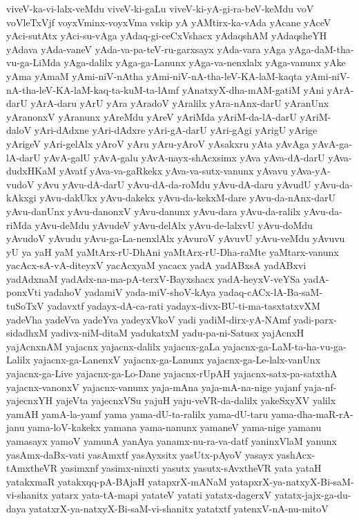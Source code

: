 {viveV-ka-vi-lalx-veMdu
viveV-ki-gaLu
viveV-ki-yA-gi-ra-beV-keMdu
voV
voVleTxVjf
voyxVminx-voyxVma
vskip
yA
yAMtirx-ka-vAda
yAcane
yAceV
yAci-sutAtx
yAci-su-vAga
yAdaq-gi-ceCxVshacx
yAdaqshAM
yAdaqsheYH
yAdava
yAda-vaneV
yAda-va-pa-teV-ru-garxsayx
yAda-vara
yAga
yAga-daM-tha-vu-ga-LiMda
yAga-dalilx
yAga-ga-Lanunx
yAga-va-nenxlalx
yAga-vanunx
yAke
yAma
yAmaM
yAmi-niV-nAtha
yAmi-niV-nA-tha-leV-KA-laM-kaqta
yAmi-niV-nA-tha-leV-KA-laM-kaq-ta-kuM-ta-lAmf
yAnatxyX-dha-mAM-gatiM
yAni
yArA-darU
yArA-daru
yArU
yAra
yAradoV
yAralilx
yAra-nAnx-darU
yAranUnx
yAranonxV
yAranunx
yAreMdu
yAreV
yAriMda
yAriM-da-lA-darU
yAriM-daloV
yAri-dAdxne
yAri-dAdxre
yAri-gA-darU
yAri-gAgi
yArigU
yArige
yArigeV
yAri-gelAlx
yAroV
yAru
yAru-yAroV
yAsakxru
yAta
yAvAga
yAvA-ga-lA-darU
yAvA-galU
yAvA-galu
yAvA-nayx-shAcxsimx
yAva
yAva-dA-darU
yAva-dudxHKaM
yAvatf
yAva-va-gaRkekx
yAva-va-sutx-vanunx
yAvavu
yAva-yA-vudoV
yAvu
yAvu-dA-darU
yAvu-dA-da-roMdu
yAvu-dA-daru
yAvudU
yAvu-da-kAkxgi
yAvu-dakUkx
yAvu-dakekx
yAvu-da-kekxM-dare
yAvu-da-nAnx-darU
yAvu-danUnx
yAvu-danonxV
yAvu-danunx
yAvu-dara
yAvu-da-ralilx
yAvu-da-riMda
yAvu-deMdu
yAvudeV
yAvu-delAlx
yAvu-de-lalxvU
yAvu-doMdu
yAvudoV
yAvudu
yAvu-ga-La-nenxlAlx
yAvuroV
yAvuvU
yAvu-veMdu
yAvuvu
yU
ya
yaH
yaM
yaMtArx-rU-DhAni
yaMtArx-rU-Dha-raMte
yaMtarx-vanunx
yacAcx-sA-vA-diteyxV
yacAcxyaM
yacacx
yadA
yadABxsA
yadABxvi
yadAdxnaM
yadAdx-na-ma-pA-terxV-Bayxshacx
yadA-heyxV-veYSa
yadA-ponxVti
yadahoV
yadamiV
yada-miV-shoV-kAya
yadaq-cACx-lA-Ba-saM-tuSoTxV
yadavxtf
yadayx-dA-ca-rati
yadayx-divx-BU-ti-ma-tasxtatxvXM
yadeVha
yadeVva
yadeYva
yadeyxVkoV
yadi
yadiM-dirx-yA-NAmf
yadi-parx-sidadhxM
yadivx-niM-ditaM
yadukatxM
yadu-pa-ni-Satusx
yajAcnxH
yajAcnxnAM
yajacnx
yajacnx-dalilx
yajacnx-gaLa
yajacnx-ga-LaM-ta-ha-vu-ga-Lalilx
yajacnx-ga-LanenxV
yajacnx-ga-Lanunx
yajacnx-ga-Le-lalx-vanUnx
yajacnx-ga-Live
yajacnx-ga-Lo-Dane
yajacnx-rUpAH
yajacnx-satx-pa-satxthA
yajacnx-vanonxV
yajacnx-vanunx
yaja-mAna
yaja-mA-na-nige
yajanf
yaja-nf-yajecnxYH
yajeVta
yajecnxVSu
yajuH
yaju-veVR-da-dalilx
yakeSxyXV
yalilx
yamAH
yamA-la-yamf
yama
yama-dU-ta-ralilx
yama-dU-taru
yama-dha-maR-rA-janu
yama-loV-kakekx
yamana
yama-nanunx
yamaneV
yama-nige
yamanu
yamasayx
yamoV
yamunA
yanAya
yanamx-nu-ra-va-datf
yaninxVlaM
yanunx
yasAmx-daBx-vati
yasAmxtf
yasAyxsitx
yasUtx-pAyoV
yasayx
yashAcx-tAmxtheVR
yasimxnf
yasimx-ninxti
yasutx
yasutx-sAvxtheVR
yata
yataH
yatakxmaR
yatakxqq-pA-BAjaH
yatapxrX-mANaM
yatapxrX-ya-natxyX-Bi-saM-vi-shanitx
yatarx
yata-tA-mapi
yatateV
yatati
yatatx-dagerxV
yatatx-jajx-ga-du-daya
yatatxrX-ya-natxyX-Bi-saM-vi-shanitx
yatatxtf
yatenxV-nA-nu-mitoV
}
